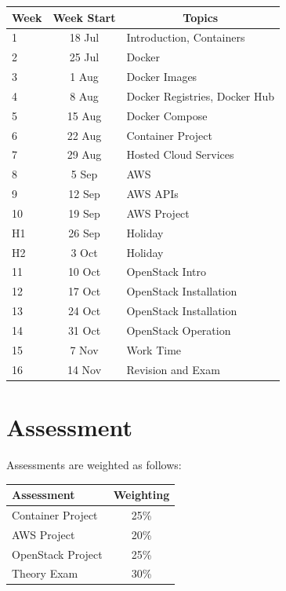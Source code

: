 \documentclass{article}
\begin{document}
\renewcommand{\arraystretch}{1.5}
\begin{tabular}{|l|c|l|}
\hline
 Week & Week Start & \multicolumn{1}{c|}{Topics}             \\ \hline
 1    & 18 Jul     & Introduction, Containers                 \\ \hline
 2    & 25 Jul     & Docker                                        \\ \hline
 3    &  1 Aug     & Docker Images                            \\ \hline
 4    & 8 Aug     & Docker Registries, Docker Hub            \\ \hline
 5    & 15 Aug     & Docker Compose                  \\ \hline
 6    & 22 Aug     & Container Project                            \\ \hline
 7    & 29 Aug     & Hosted Cloud Services                            \\ \hline
 8    &  5 Sep     &  AWS                            \\ \hline
 9    & 12 Sep     & AWS APIs                                      \\ \hline
 10   & 19 Sep     & AWS Project                                  \\ \hline
 H1   & 26 Sep     & Holiday                                  \\ \hline
 H2   &  3 Oct     & Holiday                                  \\ \hline
 11   & 10 Oct     & OpenStack Intro                               \\ \hline
 12   & 17 Oct     & OpenStack Installation                               \\ \hline
 13   & 24 Oct     & OpenStack Installation                             \\ \hline
 14   & 31 Oct     & OpenStack Operation                              \\ \hline
 15   &  7 Nov     & Work Time                               \\ \hline
 16   & 14 Nov     & Revision and Exam                       \\ \hline
\end{tabular}

\section*{Assessment}

Assessments are weighted as follows: \\
\begin{tabular}{|l|c|}
\hline
Assessment                  &  Weighting \\ \hline
Container Project           &  25\% \\ \hline
AWS Project                 &  20\% \\ \hline
OpenStack Project           &  25\% \\ \hline
Theory Exam                 &  30\% \\ \hline
\end{tabular}
\end{document}
